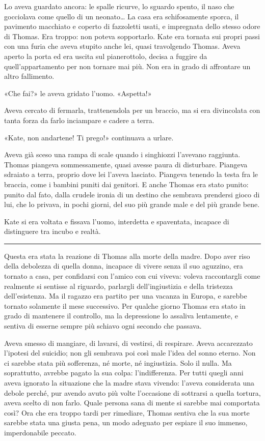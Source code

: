 \documentclass[a4paper,oneside,10pt]{memoir}
\begin{document}
Lo aveva guardato ancora: le spalle ricurve, lo sguardo spento, il naso che gocciolava come quello di un neonato\dots{}
La casa era schifosamente sporca, il pavimento macchiato e coperto di fazzoletti usati, e impregnata dello stesso odore
di Thomas. Era troppo: non poteva sopportarlo. Kate era tornata sui propri passi con una furia che aveva stupito anche
lei, quasi travolgendo Thomas. Aveva aperto la porta ed era uscita sul pianerottolo, decisa a fuggire da
quell'appartamento per non tornare mai più. Non era in grado di affrontare un altro fallimento.

«Che fai?» le aveva gridato l'uomo. «Aspetta!»

Aveva cercato di fermarla, trattenendola per un braccio, ma si era divincolata con tanta forza da farlo inciampare e
cadere a terra.

«Kate, non andartene! Ti prego!» continuava a urlare.

Aveva già sceso una rampa di scale quando i singhiozzi l'avevano raggiunta. Thomas piangeva sommessamente, quasi avesse
paura di disturbare. Piangeva sdraiato a terra, proprio dove lei l'aveva lasciato. Piangeva tenendo la testa fra le
braccia, come i bambini puniti dai genitori. E anche Thomas era stato punito: punito dal fato, dalla crudele ironia di
un destino che sembrava prendersi gioco di lui, che lo privava, in pochi giorni, del suo più grande male e del più
grande bene.

Kate si era voltata e fissava l'uomo, interdetta e spaventata, incapace di distinguere tra incubo e realtà.

\plainbreak{1}

Questa era stata la reazione di Thomas alla morte della madre. Dopo aver riso della debolezza di quella donna, incapace
di vivere senza il suo aguzzino, era tornato a casa, per confidarsi con l'amico con cui viveva: voleva raccontargli come
realmente si sentisse al riguardo, parlargli dell'ingiustizia e della tristezza dell'esistenza. Ma il ragazzo era
partito per una vacanza in Europa, e sarebbe tornato solamente il mese successivo. Per qualche giorno Thomas era stato
in grado di mantenere il controllo, ma la depressione lo assaliva lentamente, e sentiva di esserne sempre più schiavo
ogni secondo che passava.

Aveva smesso di mangiare, di lavarsi, di vestirsi, di respirare. Aveva accarezzato l'ipotesi del suicidio; non gli
sembrava poi così male l'idea del sonno eterno. Non ci sarebbe stata più sofferenza, né morte, né ingiustizia. Solo il
nulla. Ma soprattutto, avrebbe pagato la sua colpa: l'indifferenza. Per tutti quegli anni aveva ignorato la situazione
che la madre stava vivendo: l'aveva considerata una debole perché, pur avendo avuto più volte l'occasione di sottrarsi a
quella tortura, aveva scelto di non farlo. Quale persona sana di mente si sarebbe mai comportata così? Ora che era
troppo tardi per rimediare, Thomas sentiva che la sua morte sarebbe stata una giusta pena, un modo adeguato per espiare
il suo immenso, imperdonabile peccato.
\end{document}
